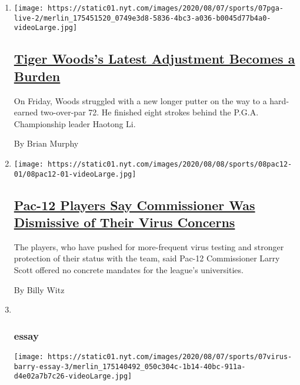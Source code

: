 \begin{enumerate}
\def\labelenumi{\arabic{enumi}.}
\item
  \texttt{[image: https://static01.nyt.com/images/2020/08/07/sports/07pga-live-2/merlin\_175451520\_0749e3d8-5836-4bc3-a036-b0045d77b4a0-videoLarge.jpg]}

  \hypertarget{tiger-woodss-latest-adjustment-becomes-a-burden}{%
  \subsection{\texorpdfstring{\href{/2020/08/08/sports/golf/tiger-woods-pga-championship-friday.html}{Tiger
  Woods's Latest Adjustment Becomes a
  Burden}}{Tiger Woods's Latest Adjustment Becomes a Burden}}\label{tiger-woodss-latest-adjustment-becomes-a-burden}}

  On Friday, Woods struggled with a new longer putter on the way to a
  hard-earned two-over-par 72. He finished eight strokes behind the
  P.G.A. Championship leader Haotong Li.

  By Brian Murphy
\item
  \texttt{[image: https://static01.nyt.com/images/2020/08/08/sports/08pac12-01/08pac12-01-videoLarge.jpg]}

  \hypertarget{pac-12-players-say-commissioner-was-dismissive-of-their-virus-concerns}{%
  \subsection{\texorpdfstring{\href{/2020/08/08/sports/ncaafootball/coronavirus-pac-12-players-larry-scott.html}{Pac-12
  Players Say Commissioner Was Dismissive of Their Virus
  Concerns}}{Pac-12 Players Say Commissioner Was Dismissive of Their Virus Concerns}}\label{pac-12-players-say-commissioner-was-dismissive-of-their-virus-concerns}}

  The players, who have pushed for more-frequent virus testing and
  stronger protection of their status with the team, said Pac-12
  Commissioner Larry Scott offered no concrete mandates for the league's
  universities.

  By Billy Witz
\item ~
  \hypertarget{essay}{%
  \subsubsection{essay}\label{essay}}

  \texttt{[image: https://static01.nyt.com/images/2020/08/07/sports/07virus-barry-essay-3/merlin\_175140492\_050c304c-1b14-40bc-911a-d4e02a7b7c26-videoLarge.jpg]}


\end{enumerate}
